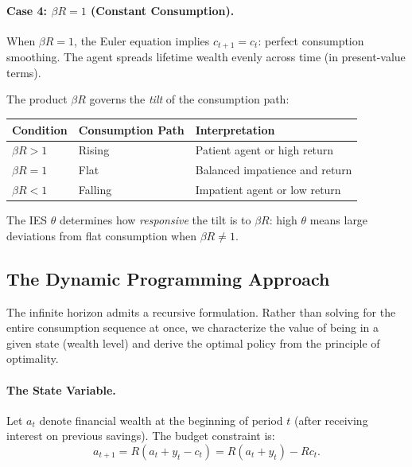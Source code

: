 \paragraph{Case 4: $\beta R = 1$ (Constant Consumption).}
When $\beta R = 1$, the Euler equation implies $c_{t+1} = c_t$: perfect consumption smoothing. The agent spreads lifetime wealth evenly across time (in present-value terms).

\begin{calloutimportant}
The product $\beta R$ governs the \emph{tilt} of the consumption path:
\begin{center}
\renewcommand{\arraystretch}{1.3}
\begin{tabular}{@{}lll@{}}
\toprule
\textbf{Condition} & \textbf{Consumption Path} & \textbf{Interpretation} \\
\midrule
$\beta R > 1$ & Rising & Patient agent or high return \\
$\beta R = 1$ & Flat & Balanced impatience and return \\
$\beta R < 1$ & Falling & Impatient agent or low return \\
\bottomrule
\end{tabular}
\end{center}

The IES $\theta$ determines how \emph{responsive} the tilt is to $\beta R$: high $\theta$ means large deviations from flat consumption when $\beta R \neq 1$.
\end{calloutimportant}

\subsection{The Dynamic Programming Approach}
\label{subsec:dp-approach}

The infinite horizon admits a recursive formulation. Rather than solving for the entire consumption sequence at once, we characterize the value of being in a given state (wealth level) and derive the optimal policy from the principle of optimality.

\paragraph{The State Variable.}
Let $a_t$ denote financial wealth at the beginning of period $t$ (after receiving interest on previous savings). The budget constraint is:
\begin{equation}
a_{t+1} = R(a_t + y_t - c_t) = R(a_t + y_t) - R c_t.
\label{eq:budget-recursive}
\end{equation}

